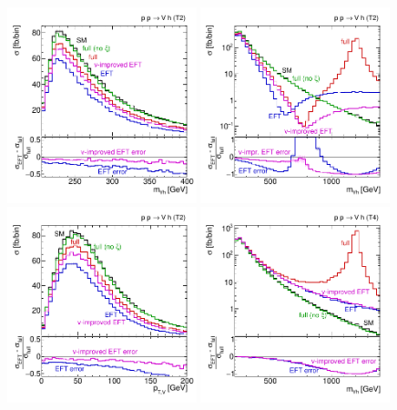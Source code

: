\begin{figure}
  \includegraphics[width=0.49\textwidth,clip=true,trim=0 0.2cm 0 0.2cm]{fig/validity/Triplet_VH.pdf}%
  \includegraphics[width=0.49\textwidth,clip=true,trim=0 0.2cm 0 0.2cm]{fig/validity/Triplet_VH_log.pdf}\\%
  \includegraphics[width=0.49\textwidth,clip=true,trim=0 0.2cm 0 0.2cm]{fig/validity/Triplet_VH_pT.pdf}%
  \includegraphics[width=0.49\textwidth,clip=true,trim=0 0.2cm 0 0.2cm]{fig/validity/Triplet_VH_realistic.pdf}%

\end{figure}
